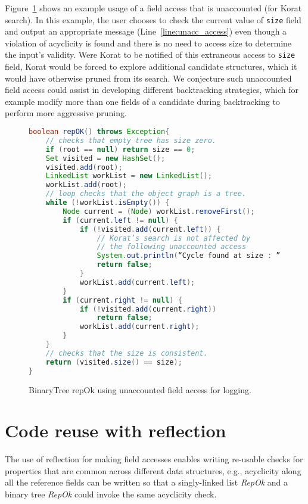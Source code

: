 Figure~\ref{fig:bTreeUnaccountedFieldAccess} shows an example usage of
a field access that is unaccounted (for Korat search).  In this
example, the user chooses to check the current value of \texttt{size}
field and output an appropriate message (Line~\ref{line:unacc_access}) even though a
violation of acyclicity is found and there is no need to access size
to determine the input's validity.  Were Korat to be notified of this
extraneous access to \texttt{size} field, Korat would be forced to
explore additional candidate structures, which it would have otherwise
pruned from its search.  We conjecture such unaccounted field access
could assist in developing different backtracking strategies, which
for example modify more than one fields of a candidate during
backtracking to perform more aggressive pruning.

\begin{figure}
\centering
\begin{lstlisting}[language=Java,escapechar=|]
boolean repOK() throws Exception{
    // checks that empty tree has size zero.
    if (root == null) return size == 0;
    Set visited = new HashSet();
    visited.add(root);
    LinkedList workList = new LinkedList();
    workList.add(root);
    // loop checks that the object graph is a tree.
    while (!workList.isEmpty()) {
        Node current = (Node) workList.removeFirst();
        if (current.left != null) {
            if (!visited.add(current.left)) {
                // Korat’s search is not affected by
                // the following unaccounted access
                System.out.println(“Cycle found at size : ” + (int)ReflectionUtils.unaccountedAccess(this,”size”));|\label{line:unacc_access}|
                return false;
            }
            workList.add(current.left);
        }
        if (current.right != null) {
            if (!visited.add(current.right)) 
                return false;
            workList.add(current.right);
        }
    }
    // checks that the size is consistent.
    return (visited.size() == size);
}
\end{lstlisting}
\caption{BinaryTree repOk using unaccounted field access for logging.}
\label{fig:bTreeUnaccountedFieldAccess}
\end{figure}

\section{Code reuse with reflection}
\label{sec:code-reuse-with-reflection}
The use of reflection for making field accesses enables writing
re-usable checks for properties that are common across different data
structures, e.g., acyclicity along all the reference fields can be
written so that a singly-linked list \emph{RepOk} and a binary tree \emph{RepOk}
could invoke the same acyclicity check.

